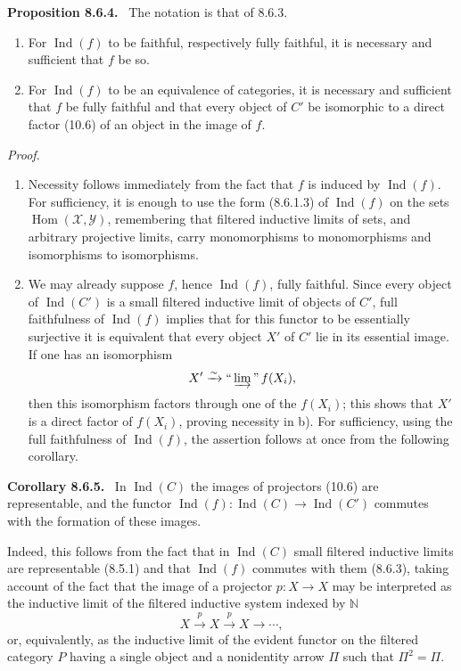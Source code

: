 \documentclass[11pt]{article}
\newcommand{\Hom}{\operatorname{Hom}}
\newcommand{\Ind}{\operatorname{Ind}}
\newenvironment{statement}[1]{\par\medskip\noindent\textbf{#1.}\ }{\par\medskip}
\newenvironment{proofsketch}{\par\noindent\emph{Proof.}\ }{\par\medskip}
\begin{document}
\begin{statement}{Proposition 8.6.4}
The notation is that of 8.6.3.
\begin{enumerate}[label=\alph*)]
\item For $\Ind(f)$ to be faithful, respectively fully faithful, it is necessary and sufficient that $f$ be so.
\item For $\Ind(f)$ to be an equivalence of categories, it is necessary and sufficient that $f$ be fully faithful and that every object of $C'$ be isomorphic to a direct factor (10.6) of an object in the image of $f$.
\end{enumerate}
\end{statement}

\begin{proofsketch}
\begin{enumerate}[label=\alph*)]
\item Necessity follows immediately from the fact that $f$ is induced by $\Ind(f)$. For sufficiency, it is enough to use the form (8.6.1.3) of $\Ind(f)$ on the sets $\Hom(\mathcal X,\mathcal Y)$, remembering that filtered inductive limits of sets, and arbitrary projective limits, carry monomorphisms to monomorphisms and isomorphisms to isomorphisms.

\item We may already suppose $f$, hence $\Ind(f)$, fully faithful. Since every object of $\Ind(C')$ is a small filtered inductive limit of objects of $C'$, full faithfulness of $\Ind(f)$ implies that for this functor to be essentially surjective it is equivalent that every object $X'$ of $C'$ lie in its essential image. If one has an isomorphism
\[
X'\xrightarrow{\sim}\textrm{``}\varinjlim\textrm{''}\,f(X_i),
\]
then this isomorphism factors through one of the $f(X_i)$; this shows that $X'$ is a direct factor of $f(X_i)$, proving necessity in b). For sufficiency, using the full faithfulness of $\Ind(f)$, the assertion follows at once from the following corollary.
\end{enumerate}
\end{proofsketch}

\begin{statement}{Corollary 8.6.5}
In $\Ind(C)$ the images of projectors (10.6) are representable, and the functor $\Ind(f):\Ind(C)\to\Ind(C')$ commutes with the formation of these images.
\end{statement}

Indeed, this follows from the fact that in $\Ind(C)$ small filtered inductive limits are representable (8.5.1) and that $\Ind(f)$ commutes with them (8.6.3), taking account of the fact that the image of a projector $p:X\to X$ may be interpreted as the inductive limit of the filtered inductive system indexed by $\mathbb N$
\[
X\xrightarrow{p}X\xrightarrow{p}X\longrightarrow\cdots,
\]
or, equivalently, as the inductive limit of the evident functor on the filtered category $P$ having a single object and a nonidentity arrow $\Pi$ such that $\Pi^2=\Pi$.
\end{document}
